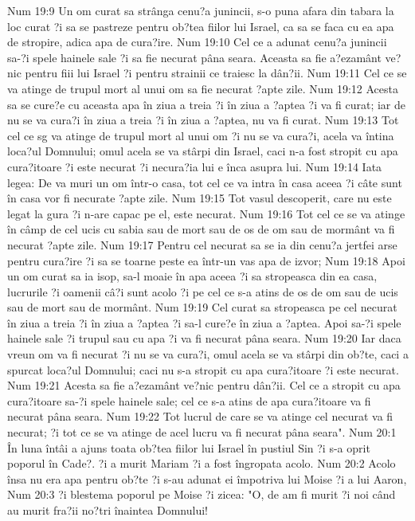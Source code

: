 Num 19:9  Un om curat sa strânga cenu?a junincii, s-o puna afara din tabara la loc curat ?i sa se pastreze pentru ob?tea fiilor lui Israel, ca sa se faca cu ea apa de stropire, adica apa de cura?ire.
Num 19:10  Cel ce a adunat cenu?a junincii sa-?i spele hainele sale ?i sa fie necurat pâna seara. Aceasta sa fie a?ezamânt ve?nic pentru fiii lui Israel ?i pentru strainii ce traiesc la dân?ii.
Num 19:11  Cel ce se va atinge de trupul mort al unui om sa fie necurat ?apte zile.
Num 19:12  Acesta sa se cure?e cu aceasta apa în ziua a treia ?i în ziua a ?aptea ?i va fi curat; iar de nu se va cura?i în ziua a treia ?i în ziua a ?aptea, nu va fi curat.
Num 19:13  Tot cel ce sg va atinge de trupul mort al unui om ?i nu se va cura?i, acela va întina loca?ul Domnului; omul acela se va stârpi din Israel, caci n-a fost stropit cu apa cura?itoare ?i este necurat ?i necura?ia lui e înca asupra lui.
Num 19:14  Iata legea: De va muri un om într-o casa, tot cel ce va intra în casa aceea ?i câte sunt în casa vor fi necurate ?apte zile.
Num 19:15  Tot vasul descoperit, care nu este legat la gura ?i n-are capac pe el, este necurat.
Num 19:16  Tot cel ce se va atinge în câmp de cel ucis cu sabia sau de mort sau de os de om sau de mormânt va fi necurat ?apte zile.
Num 19:17  Pentru cel necurat sa se ia din cenu?a jertfei arse pentru cura?ire ?i sa se toarne peste ea într-un vas apa de izvor;
Num 19:18  Apoi un om curat sa ia isop, sa-l moaie în apa aceea ?i sa stropeasca din ea casa, lucrurile ?i oamenii câ?i sunt acolo ?i pe cel ce s-a atins de os de om sau de ucis sau de mort sau de mormânt.
Num 19:19  Cel curat sa stropeasca pe cel necurat în ziua a treia ?i în ziua a ?aptea ?i sa-l cure?e în ziua a ?aptea. Apoi sa-?i spele hainele sale ?i trupul sau cu apa ?i va fi necurat pâna seara.
Num 19:20  Iar daca vreun om va fi necurat ?i nu se va cura?i, omul acela se va stârpi din ob?te, caci a spurcat loca?ul Domnului; caci nu s-a stropit cu apa cura?itoare ?i este necurat.
Num 19:21  Acesta sa fie a?ezamânt ve?nic pentru dân?ii. Cel ce a stropit cu apa cura?itoare sa-?i spele hainele sale; cel ce s-a atins de apa cura?itoare va fi necurat pâna seara.
Num 19:22  Tot lucrul de care se va atinge cel necurat va fi necurat; ?i tot ce se va atinge de acel lucru va fi necurat pâna seara".
Num 20:1  În luna întâi a ajuns toata ob?tea fiilor lui Israel în pustiul Sin ?i s-a oprit poporul în Cade?. ?i a murit Mariam ?i a fost îngropata acolo.
Num 20:2  Acolo însa nu era apa pentru ob?te ?i s-au adunat ei împotriva lui Moise ?i a lui Aaron,
Num 20:3  ?i blestema poporul pe Moise ?i zicea: "O, de am fi murit ?i noi când au murit fra?ii no?tri înaintea Domnului!
